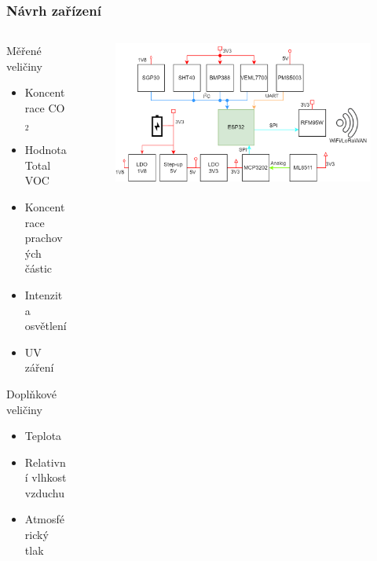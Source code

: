 \documentclass[%
  12pt,       				%
	t,                  %
	aspectratio=1610,   %
	unicode,						%
]{beamer}				    	%
\begin{document}

\begin{frame}
	\frametitle{Návrh zařízení}
	\begin{columns}[T]
		\begin{column}{0.4\textwidth}
			Měřené veličiny
			\begin{itemize}
				\item Koncentrace CO$_{2}$
				\item Hodnota Total VOC
				\item Koncentrace prachových částic
				\item Intenzita osvětlení
				\item UV záření
			\end{itemize}
			Doplňkové veličiny
			\begin{itemize}
				\item Teplota
				\item Relativní vlhkost vzduchu
				\item Atmosférický tlak
			\end{itemize}	
		\end{column}

		\begin{column}{0.6\textwidth}
			\begin{figure}
				\centering
				\vspace{4ex}
				\includegraphics[width=\textwidth]{obrazky/block_schematic.png}
			\end{figure}
			
		\end{column}
	\end{columns}
\end{frame}

\end{document}
